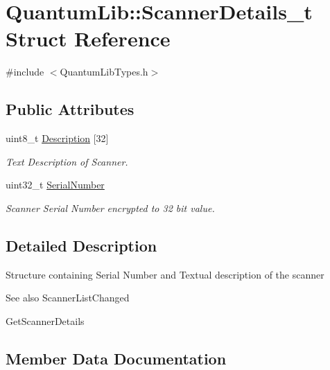 \hypertarget{struct_quantum_lib_1_1_scanner_details__t}{}\section{Quantum\+Lib\+:\+:Scanner\+Details\+\_\+t Struct Reference}
\label{struct_quantum_lib_1_1_scanner_details__t}


{\ttfamily \#include $<$Quantum\+Lib\+Types.\+h$>$}

\subsection*{Public Attributes}
\begin{DoxyCompactItemize}
\item 
uint8\+\_\+t \mbox{\hyperlink{struct_quantum_lib_1_1_scanner_details__t_ac7f36be94b3634ef1c0d30a42cb3ef5f}{Description}} \mbox{[}32\mbox{]}
\begin{DoxyCompactList}\small\item\em Text Description of Scanner. \end{DoxyCompactList}\item 
uint32\+\_\+t \mbox{\hyperlink{struct_quantum_lib_1_1_scanner_details__t_a796ccbe4f3e77e5a2014bd515c06cde4}{Serial\+Number}}
\begin{DoxyCompactList}\small\item\em Scanner Serial Number encrypted to 32 bit value. \end{DoxyCompactList}\end{DoxyCompactItemize}


\subsection{Detailed Description}
Structure containing Serial Number and Textual description of the scanner \begin{DoxySeeAlso}{See also}
Scanner\+List\+Changed 

Get\+Scanner\+Details 
\end{DoxySeeAlso}


\subsection{Member Data Documentation}
\mbox{\label{struct_quantum_lib_1_1_scanner_details__t_ac7f36be94b3634ef1c0d30a42cb3ef5f}} 
